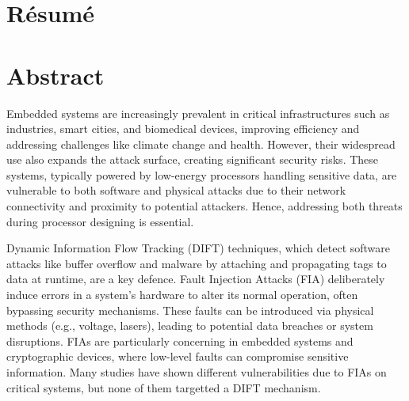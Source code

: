 \chapter*{Résumé}
\label{chapter:resume}

\chapter*{Abstract}
\label{chapter:abstract}

Embedded systems are increasingly prevalent in critical infrastructures such as industries, smart cities, and biomedical devices, improving efficiency and addressing challenges like climate change and health. However, their widespread use also expands the attack surface, creating significant security risks. These systems, typically powered by low-energy processors handling sensitive data, are vulnerable to both software and physical attacks due to their network connectivity and proximity to potential attackers. Hence, addressing both threats during processor designing is essential.

Dynamic Information Flow Tracking (DIFT) techniques, which detect software attacks like buffer overflow and malware by attaching and propagating tags to data at runtime, are a key defence.
Fault Injection Attacks (FIA) deliberately induce errors in a system's hardware to alter its normal operation, often bypassing security mechanisms. These faults can be introduced via physical methods (e.g., voltage, lasers), leading to potential data breaches or system disruptions. FIAs are particularly concerning in embedded systems and cryptographic devices, where low-level faults can compromise sensitive information. Many studies have shown different vulnerabilities due to FIAs on critical systems, but none of them targetted a DIFT mechanism.

